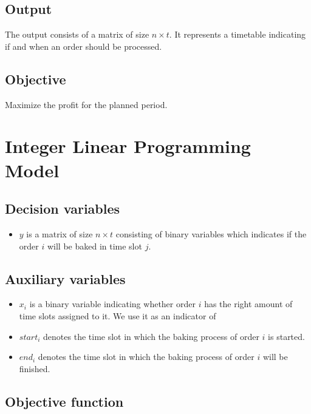 \documentclass{article}
\begin{document}
\subsection*{Output}
The output consists of a matrix of size $n \times t$.
It represents a timetable indicating if and when an order should be processed. 

\subsection*{Objective}
Maximize the profit for the planned period.

\section{Integer Linear Programming Model}

\subsection{Decision variables}
\begin{itemize}
    \item $y$ is a matrix of size $n \times t$ consisting of binary variables which indicates if the order $i$ will be baked in time slot $j$.
\end{itemize}

\subsection{Auxiliary variables}

\begin{itemize}
\item $x_i$ is a binary variable indicating whether order $i$ has the right amount of time slots assigned to it. 
We use it as an indicator of 
\item $\mathit{start}_{i}$ denotes the time slot in which the baking process of order $i$ is started.
\item $\mathit{end}_{i}$ denotes the time slot in which the baking process of order $i$ will be finished.
\end{itemize}

\subsection{Objective function}
\end{document}
